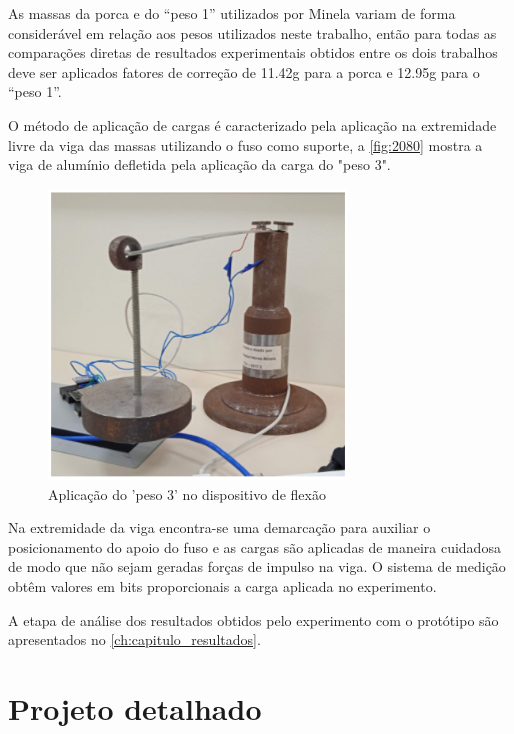 As massas da porca e do “peso 1” utilizados por Minela variam de forma considerável em relação aos pesos utilizados neste trabalho, então para todas as comparações diretas de
resultados experimentais obtidos entre os dois trabalhos deve ser aplicados fatores de correção de 11.42g para a porca e 12.95g para o “peso 1”.

O método de aplicação de cargas é caracterizado pela aplicação na extremidade livre da viga das massas utilizando o fuso como suporte, a \autoref{fig:2080} mostra a viga de alumínio defletida
pela aplicação da carga do "peso 3".

\begin{figure}[H]
	\caption{\label{fig:2080} Aplicação do 'peso 3' no dispositivo de flexão}
	\begin{center}
		\includegraphics[width=300]{pictures/2080.png}
	\end{center}
\end{figure}

Na extremidade da viga encontra-se uma demarcação para auxiliar o posicionamento do apoio do fuso e as cargas são aplicadas de maneira cuidadosa de modo que não sejam geradas forças de
impulso na viga.
O sistema de medição obtêm valores em bits proporcionais a carga aplicada no experimento.

A etapa de análise dos resultados obtidos pelo experimento com o protótipo são apresentados no \autoref{ch:capitulo_resultados}.

\section{Projeto detalhado}

